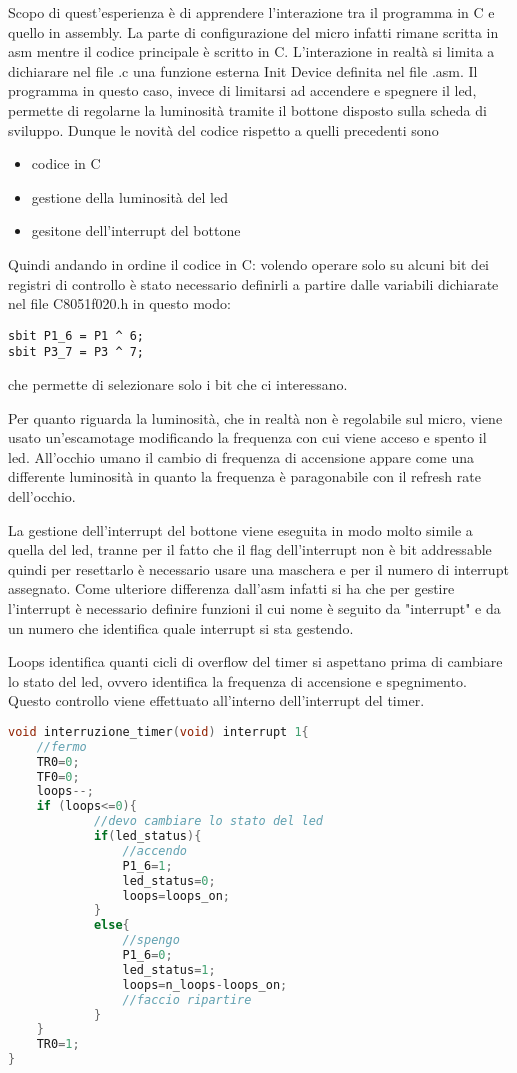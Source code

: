 \documentclass[main.tex]{subfiles}
\begin{document}
Scopo di quest'esperienza è di apprendere l'interazione tra il programma in C e quello in assembly. La parte di configurazione del micro infatti rimane scritta in asm mentre il codice principale è scritto in C. L'interazione in realtà si limita a dichiarare nel file .c una funzione esterna Init Device definita nel file .asm. Il programma in questo caso, invece di limitarsi ad accendere e spegnere il led, permette di regolarne la luminosità tramite il bottone disposto sulla scheda di sviluppo. Dunque le novità del codice rispetto a quelli precedenti sono 
\begin{itemize}
    \item codice in C
    \item gestione della luminosità del led
    \item gesitone dell'interrupt del bottone
\end{itemize}

Quindi andando in ordine il codice in C: volendo operare solo su alcuni bit dei registri di controllo è stato necessario definirli a partire dalle variabili dichiarate nel file C8051f020.h in questo modo:
\begin{lstlisting}
sbit P1_6 = P1 ^ 6;
sbit P3_7 = P3 ^ 7;
\end{lstlisting}
che permette di selezionare solo i bit che ci interessano. 

Per quanto riguarda la luminosità, che in realtà non è regolabile sul micro, viene usato un'escamotage modificando la frequenza con cui viene acceso e spento il led. All'occhio umano il cambio di frequenza di accensione appare come una differente luminosità in quanto la frequenza è paragonabile con il refresh rate dell'occhio. 

La gestione dell'interrupt del bottone viene eseguita in modo molto simile a quella del led, tranne per il fatto che il flag dell'interrupt non è bit addressable quindi per resettarlo è necessario usare una maschera e per il numero di interrupt assegnato. 
Come ulteriore differenza dall'asm infatti si ha che per gestire l'interrupt è necessario definire funzioni il cui nome è seguito da "interrupt" e da un numero che identifica quale interrupt si sta gestendo. 

 Loops identifica quanti cicli di overflow del timer si aspettano prima di cambiare lo stato del led, ovvero identifica la frequenza di accensione e spegnimento. Questo controllo viene effettuato all'interno dell'interrupt del timer.
 \begin{lstlisting}[language=C,caption=Interrupt timer]
 void interruzione_timer(void) interrupt 1{
	//fermo
	TR0=0;
	TF0=0;
	loops--;
	if (loops<=0){
	        //devo cambiare lo stato del led
			if(led_status){
				//accendo
				P1_6=1;
				led_status=0;
				loops=loops_on;
			}
			else{
				//spengo
				P1_6=0;
				led_status=1;
				loops=n_loops-loops_on;
				//faccio ripartire
			}
	}
	TR0=1;
}
 \end{lstlisting}
 
\end{document}
